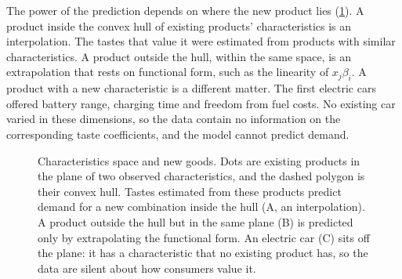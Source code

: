 The power of the prediction depends on where the new product lies (\cref{fig:04-charspace}). A product inside the
convex hull of existing products' characteristics is an interpolation. The tastes that value it were estimated
from products with similar characteristics. A product outside the hull, within the same space, is an
extrapolation that rests on functional form, such as the linearity of $x_j\beta_i$. A product with a new
characteristic is a different matter. The first electric cars offered battery range, charging time and freedom
from fuel costs. No existing car varied in these dimensions, so the data contain no information on the
corresponding taste coefficients, and the model cannot predict demand.

\begin{figure}[htbp]
\centering
{}
\caption{Characteristics space and new goods. Dots are existing products in the plane of two observed
characteristics, and the dashed polygon is their convex hull. Tastes estimated from these products predict demand
for a new combination inside the hull (A, an interpolation). A product outside the hull but in the same plane (B)
is predicted only by extrapolating the functional form. An electric car (C) sits off the plane: it has a
characteristic that no existing product has, so the data are silent about how consumers value it.}
\label{fig:04-charspace}
\end{figure}

